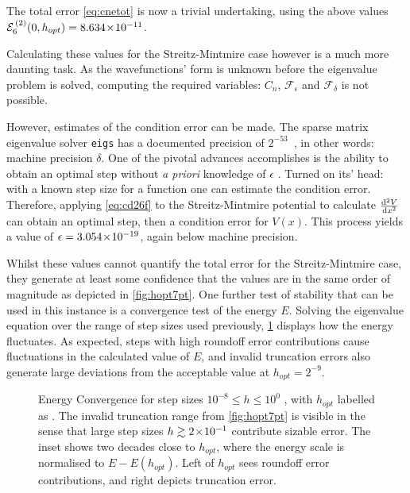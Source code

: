 The total error \cref{eq:cnetot} is now a trivial undertaking, using the above values $\mathcal{E}_6^{\,(2)}(0,h_{opt}) = 8.634\!\times\!10^{-11}$.

Calculating these values for the Streitz-Mintmire case however is a much more daunting task.
As the wavefunctions' form is unknown before the eigenvalue problem is solved, computing the required variables: $C_n$, $\mathcal{F}_\epsilon$ and $\mathcal{F}_\delta$ is not possible.

However, estimates of the condition error can be made.
The sparse matrix eigenvalue solver \texttt{eigs} has a documented precision of $2^{-53}$~\cite{Mathworks2014}, in other words: machine precision $\delta$.
One of the pivotal advances \citeauthor{Mathur2012} accomplishes is the ability to obtain an optimal step without \emph{a priori} knowledge of $\epsilon$ \cite{Mathur2012}.
Turned on its' head: with a known step size for a function one can estimate the condition error.
Therefore, applying \cref{eq:cd26f} to the Streitz-Mintmire potential to calculate $\cramped{\frac{\mathrm{d}^2V}{\mathrm{d}x^2}}$ can obtain an optimal step, then a condition error for $V(x)$.
This process yields a value of $\epsilon = 3.054\!\times\!10^{-19}$, again below machine precision.

Whilst these values cannot quantify the total error for the Streitz-Mintmire case, they generate at least some confidence that the values are in the same order of magnitude as depicted in \cref{fig:hopt7pt}.
One further test of stability that can be used in this instance is a convergence test of the energy $E$.
Solving the eigenvalue equation over the range of step sizes used previously, \cref{fig:econv} displays how the energy fluctuates.
As expected, steps with high roundoff error contributions cause fluctuations in the calculated value of $E$, and invalid truncation errors also generate large deviations from the acceptable value at $h_{opt} = 2^{-9}$.
\begin{figure}[htp]
\centering
\resizebox{0.9\columnwidth}{!}{}
\caption[Energy Convergence]{\label{fig:econv}Energy Convergence for step sizes $10^{-8}\!\leq\! h\! \leq\! 10^0$ , with $h_{opt}$ labelled as . The invalid truncation range from \cref{fig:hopt7pt} is visible in the sense that large step sizes $h\gtrsim2\!\times\!10^{-1}$ contribute sizable error. The inset shows two decades close to $h_{opt}$, where the energy scale is normalised to $E-E(h_{opt})$. Left of $h_{opt}$ sees roundoff error contributions, and right depicts truncation error.}
\end{figure}

